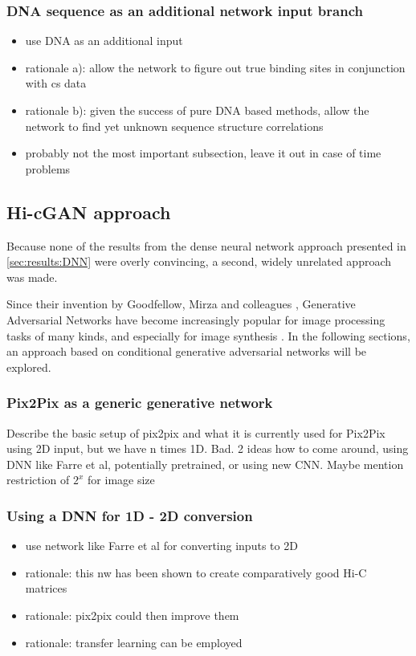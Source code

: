 \subsubsection{DNA sequence as an additional network input branch}
\begin{itemize}
 \item use DNA as an additional input
 \item rationale a): allow the network to figure out true binding sites in conjunction with cs data
 \item rationale b): given the success of pure DNA based methods, allow the network to find yet unknown sequence structure correlations
 \item probably not the most important subsection, leave it out in case of time problems
\end{itemize}

\subsection{Hi-cGAN approach} \label{sec:hi-cGAN}
Because none of the results from the dense neural network approach presented in \cref{sec:results:DNN} were overly convincing,
a second, widely unrelated approach was made.

Since their invention by Goodfellow, Mirza and colleagues \cite{Goodfellow2014, mirza2014},
Generative Adversarial Networks have become increasingly popular for image processing tasks of many kinds,
and especially for image synthesis \cite{Wang2020}. 
In the following sections, an approach based on conditional generative adversarial networks will be explored.

\subsubsection{Pix2Pix as a generic generative network}
Describe the basic setup of pix2pix and what it is currently used for
Pix2Pix using 2D input, but we have n times 1D. Bad. 2 ideas how to come around,
using DNN like Farre et al, potentially pretrained, or using new CNN. Maybe mention restriction of $2^x$ for image size
\subsubsection{Using a DNN for 1D - 2D conversion}
\begin{itemize}
\item use network like Farre et al for converting inputs to 2D
\item rationale: this nw has been shown to create comparatively good Hi-C matrices 
\item rationale: pix2pix could then improve them
\item rationale: transfer learning can be employed
\end{itemize}

